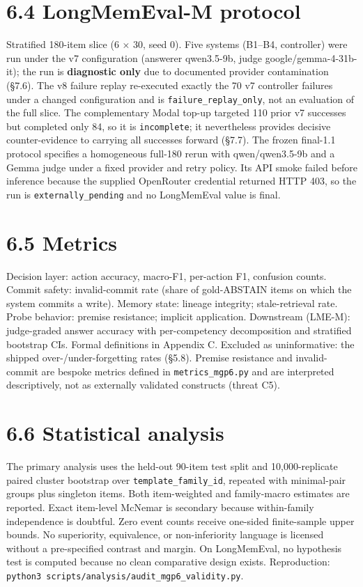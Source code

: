 \section{6.4 LongMemEval-M protocol}\label{longmemeval-m-protocol}

Stratified 180-item slice (6 × 30, seed 0). Five systems (B1--B4,
controller) were run under the v7 configuration (answerer qwen3.5-9b,
judge google/gemma-4-31b-it); the run is \textbf{diagnostic only} due to
documented provider contamination (§7.6). The v8 failure replay
re-executed exactly the 70 v7 controller failures under a changed
configuration and is \texttt{failure\_replay\_only}, not an evaluation
of the full slice. The complementary Modal top-up targeted 110 prior v7
successes but completed only 84, so it is \texttt{incomplete}; it
nevertheless provides decisive counter-evidence to carrying all
successes forward (§7.7). The frozen final-1.1 protocol specifies a
homogeneous full-180 rerun with qwen/qwen3.5-9b and a Gemma judge under
a fixed provider and retry policy. Its API smoke failed before inference
because the supplied OpenRouter credential returned HTTP 403, so the run
is \texttt{externally\_pending} and no LongMemEval value is final.

\section{6.5 Metrics}\label{metrics}

Decision layer: action accuracy, macro-F1, per-action F1, confusion
counts. Commit safety: invalid-commit rate (share of gold-ABSTAIN items
on which the system commits a write). Memory state: lineage integrity;
stale-retrieval rate. Probe behavior: premise resistance; implicit
application. Downstream (LME-M): judge-graded answer accuracy with
per-competency decomposition and stratified bootstrap CIs. Formal
definitions in Appendix C. Excluded as uninformative: the shipped
over-/under-forgetting rates (§5.8). Premise resistance and
invalid-commit are bespoke metrics defined in \texttt{metrics\_mgp6.py}
and are interpreted descriptively, not as externally validated
constructs (threat C5).

\section{6.6 Statistical analysis}\label{statistical-analysis}

The primary analysis uses the held-out 90-item test split and
10,000-replicate paired cluster bootstrap over
\texttt{template\_family\_id}, repeated with minimal-pair groups plus
singleton items. Both item-weighted and family-macro estimates are
reported. Exact item-level McNemar is secondary because within-family
independence is doubtful. Zero event counts receive one-sided
finite-sample upper bounds. No superiority, equivalence, or
non-inferiority language is licensed without a pre-specified contrast
and margin. On LongMemEval, no hypothesis test is computed because no
clean comparative design exists. Reproduction:
\texttt{python3\ scripts/analysis/audit\_mgp6\_validity.py}.

